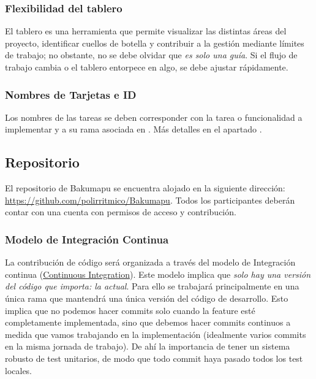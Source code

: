 \subsubsection{Flexibilidad del tablero}\label{flujo:flexibilidad}
El tablero es una herramienta que permite visualizar las distintas áreas del proyecto, identificar cuellos de botella y contribuir a la gestión mediante límites de trabajo; no obstante, no se debe olvidar que \emph{es solo una guía}. Si el flujo de trabajo cambia o el tablero entorpece en algo, se debe ajustar rápidamente.

\subsubsection{Nombres de Tarjetas e ID}\label{flujo:nombres-de-tarjetas}
Los nombres de las tareas se deben corresponder con la tarea o funcionalidad a implementar y a su rama asociada en . Más detalles en el apartado .


\subsection{Repositorio}\label{flujo:repositorio}
El repositorio  de Bakumapu se encuentra alojado en la siguiente dirección: \url{https://github.com/polirritmico/Bakumapu}. Todos los participantes deberán contar con una cuenta con permisos de acceso y contribución.

\subsubsection{Modelo de Integración Continua}\label{flujo:modelo-de-ramas}
La contribución de código será organizada a través del modelo de Integración continua (\href{https://en.wikipedia.org/wiki/Continuous_integration}{Continuous Integration}). Este modelo implica que \emph{solo hay una versión del código que importa: la actual}. Para ello se trabajará principalmente en una única rama que mantendrá una única versión del código de desarrollo. Esto implica que no podemos hacer commits solo cuando la feature esté completamente implementada, sino que debemos hacer commits continuos a medida que vamos trabajando en la implementación (idealmente varios commits en la misma jornada de trabajo). De ahí la importancia de tener un sistema robusto de test unitarios, de modo que todo commit haya pasado todos los test locales.

